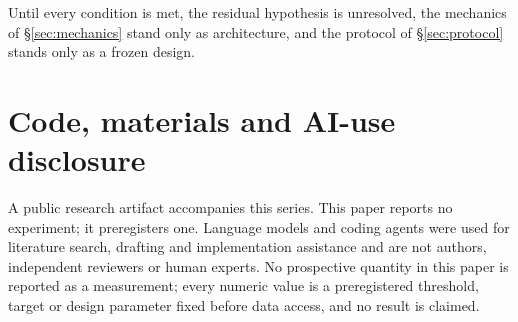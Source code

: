 \documentclass[11pt]{article}
\begin{document}
Until every condition is met, the residual hypothesis is unresolved, the mechanics of \S\ref{sec:mechanics} stand only as architecture, and the protocol of \S\ref{sec:protocol} stands only as a frozen design.

\section*{Code, materials and AI-use disclosure}
A public research artifact accompanies this series. This paper reports no experiment; it preregisters one. Language models and coding agents were used for literature search, drafting and implementation assistance and are not authors, independent reviewers or human experts. No prospective quantity in this paper is reported as a measurement; every numeric value is a preregistered threshold, target or design parameter fixed before data access, and no result is claimed.
\end{document}
